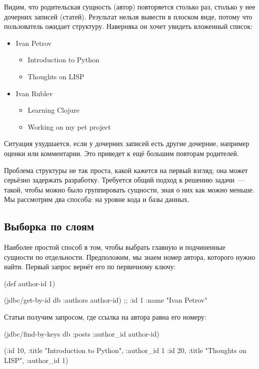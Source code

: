 Видим, что родительская сущность (автор) повторяется столько раз, столько у нее дочерних записей (статей). Результат нельзя вывести в плоском виде, потому что пользователь ожидает структуру. Наверняка он хочет увидеть вложенный список:

\begin{itemize}
\item
  Ivan Petrov
  \begin{itemize}
    \item
      Introduction to Python
    \item
      Thoughts on LISP
  \end{itemize}
\item
  Ivan Rublev
  \begin{itemize}
    \item
      Learning Clojure
    \item
      Working on my pet project
  \end{itemize}
\end{itemize}

Ситуация ухудшается, если у дочерних записей есть другие дочерние, например оценки или комментарии. Это приведет к ещё большим повторам родителей.

Проблема структуры не так проста, какой кажется на первый взгляд; она может серьёзно задержать разработку. Требуется общий подход к решению задачи~--- такой, чтобы можно было группировать сущности, зная о них как можно меньше. Мы рассмотрим два способа: на уровне кода и базы данных.

\subsection{Выборка по слоям}

Наиболее простой способ в том, чтобы выбрать главную и подчиненные сущности по отдельности. Предположим, мы знаем номер автора, которого нужно найти. Первый запрос вернёт его по первичному ключу:

\begin{english}
  \begin{clojure}
(def author-id 1)

(jdbc/get-by-id db :authors author-id)
;; {:id 1 :name "Ivan Petrov"}
  \end{clojure}
\end{english}

Статьи получим запросом, где ссылка на автора равна его номеру:

\begin{english}
  \begin{clojure}
(jdbc/find-by-keys db :posts {:author_id author-id})

({:id 10, :title "Introduction to Python", :author_id 1}
 {:id 20, :title "Thoughts on LISP", :author_id 1})
  \end{clojure}
\end{english}


